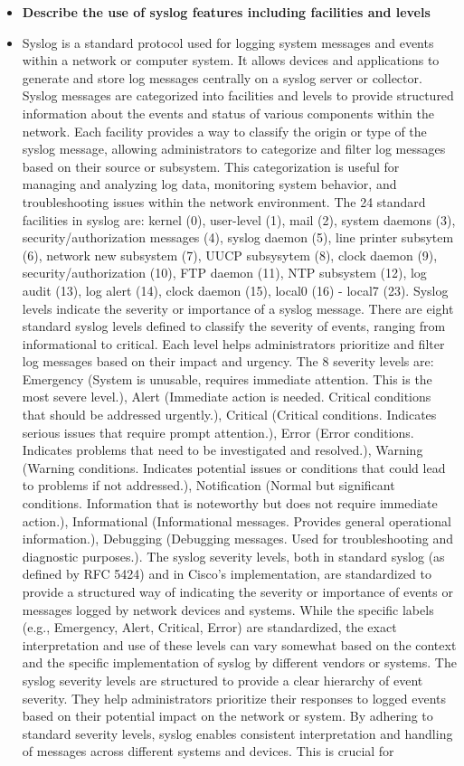 \documentclass{article}
\begin{document}
\begin{itemize}
  \item \textbf{Describe the use of syslog features including facilities and levels}
  	\item[] Syslog is a standard protocol used for logging system messages and events within a network or computer system. It allows devices and applications to generate and store log messages centrally on a syslog server or collector. Syslog messages are categorized into facilities and levels to provide structured information about the events and status of various components within the network. Each facility provides a way to classify the origin or type of the syslog message, allowing administrators to categorize and filter log messages based on their source or subsystem. This categorization is useful for managing and analyzing log data, monitoring system behavior, and troubleshooting issues within the network environment. The 24 standard facilities in syslog are: kernel (0), user-level (1), mail (2), system daemons (3), security/authorization messages (4), syslog daemon (5), line printer subsytem (6), network new subsystem (7), UUCP subsysytem (8), clock daemon (9), security/authorization (10), FTP daemon (11), NTP subsystem (12), log audit (13), log alert (14), clock daemon (15), local0 (16) - local7 (23). Syslog levels indicate the severity or importance of a syslog message. There are eight standard syslog levels defined to classify the severity of events, ranging from informational to critical. Each level helps administrators prioritize and filter log messages based on their impact and urgency. The 8 severity levels are: Emergency (System is unusable, requires immediate attention. This is the most severe level.), Alert (Immediate action is needed. Critical conditions that should be addressed urgently.), Critical (Critical conditions. Indicates serious issues that require prompt attention.), Error (Error conditions. Indicates problems that need to be investigated and resolved.), Warning (Warning conditions. Indicates potential issues or conditions that could lead to problems if not addressed.), Notification (Normal but significant conditions. Information that is noteworthy but does not require immediate action.), Informational (Informational messages. Provides general operational information.), Debugging (Debugging messages. Used for troubleshooting and diagnostic purposes.). The syslog severity levels, both in standard syslog (as defined by RFC 5424) and in Cisco's implementation, are standardized to provide a structured way of indicating the severity or importance of events or messages logged by network devices and systems. While the specific labels (e.g., Emergency, Alert, Critical, Error) are standardized, the exact interpretation and use of these levels can vary somewhat based on the context and the specific implementation of syslog by different vendors or systems. The syslog severity levels are structured to provide a clear hierarchy of event severity. They help administrators prioritize their responses to logged events based on their potential impact on the network or system. By adhering to standard severity levels, syslog enables consistent interpretation and handling of messages across different systems and devices. This is crucial for 
\end{itemize}
\end{document}
